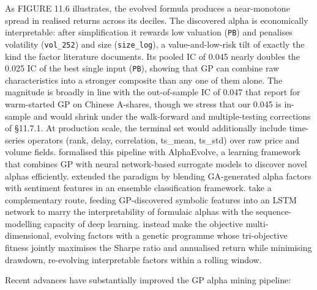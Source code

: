 As FIGURE 11.6 illustrates, the evolved formula produces a near-monotone spread in realised returns across its deciles. The discovered alpha is economically interpretable: after simplification it rewards low valuation (\texttt{PB}) and penalises volatility (\texttt{vol\_252}) and size (\texttt{size\_log}), a value-and-low-risk tilt of exactly the kind the factor literature documents. Its pooled IC of 0.045 nearly doubles the 0.025 IC of the best single input (\texttt{PB}), showing that GP can combine raw characteristics into a stronger composite than any one of them alone. The magnitude is broadly in line with the out-of-sample IC of 0.047 that \cite{Ren2024} report for warm-started GP on Chinese A-shares, though we stress that our 0.045 is in-sample and would shrink under the walk-forward and multiple-testing corrections of §11.7.1. At production scale, the terminal set would additionally include time-series operators (rank, delay, correlation, ts\_mean, ts\_std) over raw price and volume fields. \cite{Cui2021} formalised this pipeline with AlphaEvolve, a learning framework that combines GP with neural network-based surrogate models to discover novel alphas efficiently. \cite{Yang2024} extended the paradigm by blending GA-generated alpha factors with sentiment features in an ensemble classification framework. \cite{LiQ2024} take a complementary route, feeding GP-discovered symbolic features into an LSTM network to marry the interpretability of formulaic alphas with the sequence-modelling capacity of deep learning. \cite{WangGeng2026} instead make the objective multi-dimensional, evolving factors with a genetic programme whose tri-objective fitness jointly maximises the Sharpe ratio and annualised return while minimising drawdown, re-evolving interpretable factors within a rolling window.

Recent advances have substantially improved the GP alpha mining pipeline:

